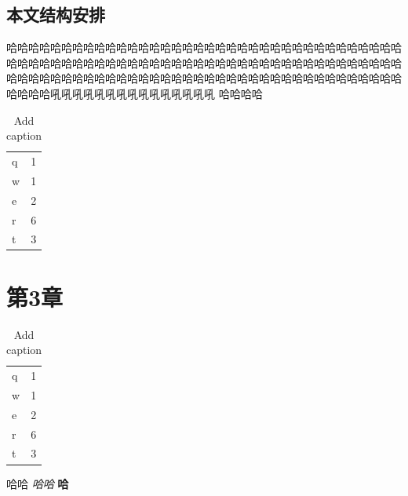 \documentclass[UTF8,twoside,zihao=-4]{ctexbook}
\begin{document}
	\section{本文结构安排}
	哈哈哈哈哈哈哈哈哈哈哈哈哈哈哈哈哈哈哈哈哈哈哈哈哈哈哈哈哈哈哈哈哈哈哈哈哈哈哈哈哈哈哈哈哈哈哈哈哈哈哈哈哈哈哈哈哈哈哈哈哈哈哈哈哈哈哈哈哈哈哈哈哈哈哈哈哈哈哈哈哈哈哈哈哈哈哈哈哈哈哈哈哈哈哈哈哈哈哈哈哈哈哈哈哈哈哈哈哈哈哈哈吼吼吼吼吼吼吼吼吼吼吼吼吼吼吼
	哈哈哈哈
	\begin{table}[htbp]
		\centering
		\caption{Add caption}
		\begin{tabular}{lr}
			
			q     & 1 \\
			w     & 1 \\
			e     & 2 \\
			r     & 6 \\
			t     & 3 \\
			
		\end{tabular}%
		\label{tab:addlabel}%
	\end{table}%
	
	\chapter{第3章}
	
	\begin{table}[htbp]
		\centering
		\caption{Add caption}
		\begin{tabular}{lr}
			
			q     & 1 \\
			w     & 1 \\
			e     & 2 \\
			r     & 6 \\
			t     & 3 \\
			
		\end{tabular}%
		\label{tab:addlabel}%
	\end{table}%
	
	{\heit 哈哈 \textit{哈哈} \textbf{哈}}
	
	\backmatter %
	
\end{document}
